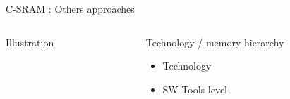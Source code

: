 \begin{Frame}{C-SRAM : Others approaches}
  \begin{columns}[t]
    \begin{column}{\BW} %
      \begin{block}{Illustration}
      \end{block}
    \end{column}
    \begin{column}{\BW} %
      \begin{block}{Technology / memory hierarchy}
        \begin{itemize}
        \item Technology
        \item SW Tools level
        \end{itemize}
      \end{block}
    \end{column}
  \end{columns}
\end{Frame}


